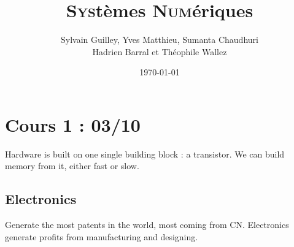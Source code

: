\documentclass{cours}
\title{\textsc{Sys}tèmes \textsc{Num}ériques}
\author{Sylvain Guilley, Yves Matthieu, Sumanta Chaudhuri\\ \small{Hadrien Barral et Théophile Wallez}}
\date{\today}
\begin{document}
    \section{Cours 1 : 03/10}
        Hardware is built on one single building block : a transistor. We can build memory from it, either fast or slow.
        \subsection{Electronics}
        Generate the most patents in the world, most coming from CN. Electronics generate profits from manufacturing and designing.
        
\end{document}
